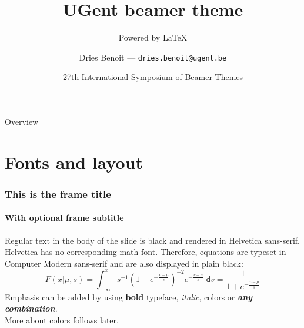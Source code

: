 \documentclass[aspectratio=169]{beamer}
\title{UGent beamer theme}
\subtitle{Powered by \LaTeX}
\date[ISBT 2018]{27th International Symposium of Beamer Themes}
\author[DB]{Dries Benoit --- \texttt{dries.benoit@ugent.be}}
\begin{document}
\logoframe

\titleframe

\begin{frame}{Overview}
    \tableofcontents[hideallsubsections]
\end{frame}

\section{Fonts and layout}

\begin{frame}
    \frametitle{This is the frame title}
    \framesubtitle{With optional frame subtitle}
    Regular text in the body of the slide is black and rendered in Helvetica sans-serif.\\[.5cm]
    Helvetica has no corresponding math font.
    Therefore, equations are typeset in Computer Modern sans-serif and are also displayed in plain black:
    \begin{equation*}
        F(x|\mu,s) = \int_{-\infty}^x s^{-1}\left(1+e^{-\frac{v-\mu}{s}}\right)^{-2} e^{-\frac{v-\mu}{s}}\;\mathsf{d}v = \frac{1}{1+e^{-\frac{x-\mu}{s}}}
    \end{equation*}
    Emphasis can be added by using \textbf{bold} typeface, \textit{italic}, {\color{ugent-alert}colors} or {\color{ugent-alert}\textbf{\textit{any combination}}}.\\
    More about colors follows later.
\end{frame}
\end{document}

